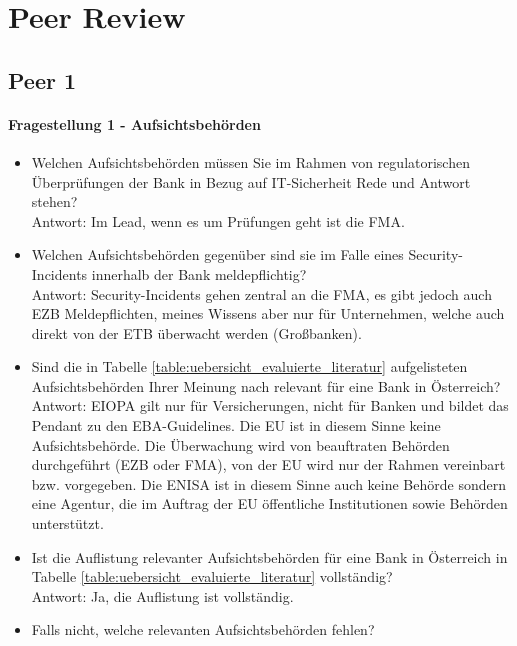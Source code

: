 \chapter{Peer Review}
\label{app:Peer Review}

\section{Peer 1}
\subsubsection{Fragestellung 1 - Aufsichtsbehörden}
\begin{itemize}
    \item Welchen Aufsichtsbehörden müssen Sie im Rahmen von regulatorischen Überprüfungen der Bank in Bezug auf IT-Sicherheit Rede und Antwort stehen?\\
    Antwort: Im Lead, wenn es um Prüfungen geht ist die FMA.\\
    \item Welchen Aufsichtsbehörden gegenüber sind sie im Falle eines Security-Incidents innerhalb der Bank meldepflichtig?\\
    Antwort: Security-Incidents gehen zentral an die FMA, es gibt jedoch auch EZB Meldepflichten, meines Wissens aber nur für Unternehmen, welche auch direkt von der ETB überwacht werden (Großbanken). \\
    \item Sind die in Tabelle \ref{table:uebersicht_evaluierte_literatur} aufgelisteten Aufsichtsbehörden Ihrer Meinung nach relevant für eine Bank in Österreich?\\
    Antwort: EIOPA gilt nur für Versicherungen, nicht für Banken und bildet das Pendant zu den EBA-Guidelines. Die EU ist in diesem Sinne keine Aufsichtsbehörde. Die Überwachung wird von beauftraten Behörden durchgeführt (EZB oder FMA), von der EU wird nur der Rahmen vereinbart bzw. vorgegeben. Die ENISA ist in diesem Sinne auch keine Behörde sondern eine Agentur, die im Auftrag der EU öffentliche Institutionen sowie Behörden unterstützt. \\
    \item Ist die Auflistung relevanter Aufsichtsbehörden für eine Bank in Österreich in Tabelle \ref{table:uebersicht_evaluierte_literatur} vollständig?\\
    Antwort: Ja, die Auflistung ist vollständig.\\
    \item Falls nicht, welche relevanten Aufsichtsbehörden fehlen?
\end{itemize}
